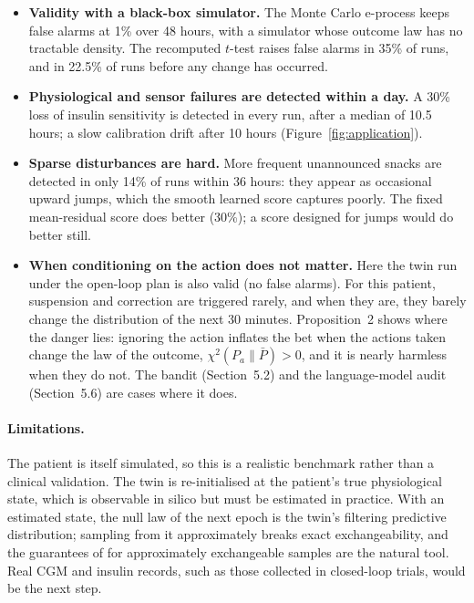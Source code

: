 \documentclass[11pt]{article}
\theoremstyle{remark}
\begin{document}
\begin{itemize}
  \item \textbf{Validity with a black-box simulator.} The Monte Carlo
        e-process keeps false alarms at 1\% over 48 hours, with a simulator
        whose outcome law has no tractable density. The recomputed $t$-test
        raises false alarms in 35\% of runs, and in 22.5\% of runs before any
        change has occurred.
  \item \textbf{Physiological and sensor failures are detected within a
        day.} A 30\% loss of insulin sensitivity is detected in every run,
        after a median of 10.5 hours; a slow calibration drift after 10 hours
        (Figure~\ref{fig:application}).
  \item \textbf{Sparse disturbances are hard.} More frequent unannounced
        snacks are detected in only 14\% of runs within 36 hours: they appear
        as occasional upward jumps, which the smooth learned score captures
        poorly. The fixed mean-residual score does better (30\%); a score
        designed for jumps would do better still.
  \item \textbf{When conditioning on the action does not matter.} Here the
        twin run under the open-loop plan is also valid (no false alarms). For
        this patient, suspension and correction are triggered rarely, and when
        they are, they barely change the distribution of the next 30 minutes.
        Proposition~2 shows where the danger lies: ignoring
        the action inflates the bet when the actions taken change the law of
        the outcome, $\chi^2(P_a\|\bar P) > 0$, and it is nearly harmless when
        they do not. The bandit
        (Section~5.2) and the language-model audit
        (Section~5.6) are cases where it does.
\end{itemize}

\paragraph{Limitations.} The patient is itself
simulated, so this is a realistic benchmark rather than a clinical
validation. The twin is re-initialised at the patient's true physiological
state, which is observable in silico but must be estimated in practice. With
an estimated state, the null law of the next epoch is the twin's filtering
predictive distribution; sampling from it approximately breaks exact
exchangeability, and the guarantees of \citet{barber2026montecarlo} for
approximately exchangeable samples are the natural tool. Real CGM and insulin
records, such as those collected in closed-loop trials, would be the next
step.
\end{document}
